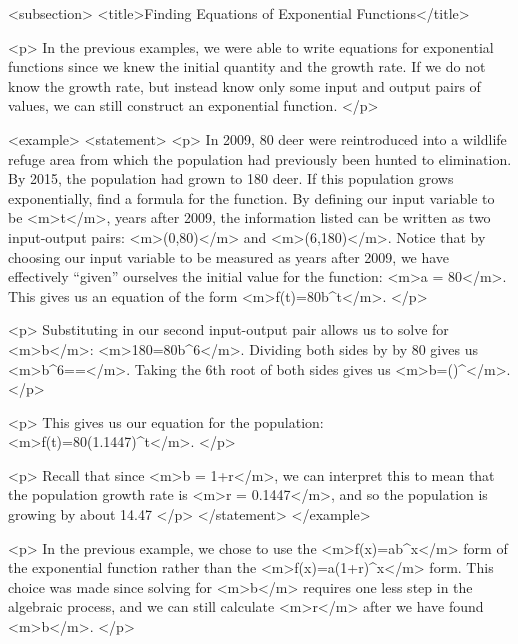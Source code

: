     <subsection>
        <title>Finding Equations of Exponential Functions</title>

        <p>
            In the previous examples, we were able to write equations for exponential functions since we knew the initial quantity and the growth rate.
            If we do not know the growth rate, but instead know only some input and output pairs of values, we can still construct an exponential function.
        </p>

        <example>
            <statement>
                <p>
                    In 2009, 80 deer were reintroduced into a wildlife refuge area from which the population had previously been hunted to elimination.
                    By 2015, the population had grown to 180 deer.
                    If this population grows exponentially, find a formula for the function.
                    By defining our input variable to be <m>t</m>, years after 2009, the information listed can be written as two input-output pairs: <m>(0,80)</m> and <m>(6,180)</m>.
                    Notice that by choosing our input variable to be measured as years after 2009, we have effectively “given” ourselves the initial value for the function: <m>a = 80</m>.
                    This gives us an equation of the form <m>f(t)=80b^{t}</m>.
                </p>

                <p>
                    Substituting in our second input-output pair allows us to solve for <m>b</m>: <m>180=80b^{6}</m>.
                    Dividing both sides by by 80 gives us <m>b^{6}==</m>.
                    Taking the 6th root of both sides gives us <m>b=()^{}</m>.
                </p>

                <p>
                    This gives us our equation for the population: <m>f(t)=80(1.1447)^{t}</m>.
                </p>

                <p>
                    Recall that since <m>b = 1+r</m>, we can interpret this to mean that the population growth rate is <m>r = 0.1447</m>, and so the population is growing by about 14.47%
                </p>
            </statement>
        </example>

        <p>
            In the previous example, we chose to use the <m>f(x)=ab^{x}</m> form of the exponential function rather than the <m>f(x)=a(1+r)^{x}</m> form.
            This choice was made since solving for <m>b</m> requires one less step in the algebraic process, and we can still calculate <m>r</m> after we have found <m>b</m>.
        </p>

